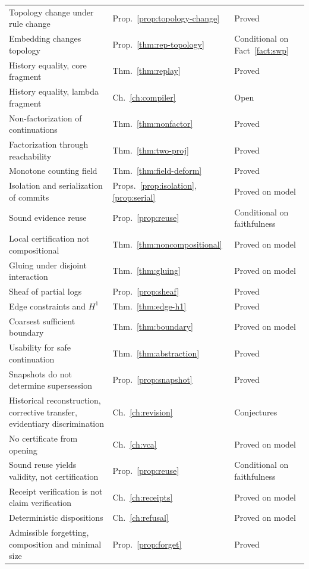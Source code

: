 \documentclass[12pt,oneside,openany]{book}
\theoremstyle{spherepop}
\theoremstyle{remarkstyle}
\begin{document}
\begin{center}
\begin{longtable}{p{}p{}p{}}
Topology change under rule change & Prop.~\ref{prop:topology-change} & Proved \\
Embedding changes topology & Prop.~\ref{thm:rep-topology} & Conditional on Fact~\ref{fact:swp} \\
History equality, core fragment & Thm.~\ref{thm:replay} & Proved \\
History equality, lambda fragment & Ch.~\ref{ch:compiler} & Open \\
Non-factorization of continuations & Thm.~\ref{thm:nonfactor} & Proved \\
Factorization through reachability & Thm.~\ref{thm:two-proj} & Proved \\
Monotone counting field & Thm.~\ref{thm:field-deform} & Proved \\
Isolation and serialization of commits & Props.~\ref{prop:isolation}, \ref{prop:serial} & Proved on model \\
Sound evidence reuse & Prop.~\ref{prop:reuse} & Conditional on faithfulness \\
Local certification not compositional & Thm.~\ref{thm:noncompositional} & Proved on model \\
Gluing under disjoint interaction & Thm.~\ref{thm:gluing} & Proved on model \\
Sheaf of partial logs & Prop.~\ref{prop:sheaf} & Proved \\
Edge constraints and $H^1$ & Thm.~\ref{thm:edge-h1} & Proved \\
Coarsest sufficient boundary & Thm.~\ref{thm:boundary} & Proved on model \\
Usability for safe continuation & Thm.~\ref{thm:abstraction} & Proved \\
Snapshots do not determine supersession & Prop.~\ref{prop:snapshot} & Proved \\
Historical reconstruction, corrective transfer, evidentiary discrimination & Ch.~\ref{ch:revision} & Conjectures \\
No certificate from opening & Ch.~\ref{ch:vca} & Proved on model \\
Sound reuse yields validity, not certification & Prop.~\ref{prop:reuse} & Conditional on faithfulness \\
Receipt verification is not claim verification & Ch.~\ref{ch:receipts} & Proved on model \\
Deterministic dispositions & Ch.~\ref{ch:refusal} & Proved on model \\
Admissible forgetting, composition and minimal size & Prop.~\ref{prop:forget} & Proved \\

\end{longtable}
\end{center}
\end{document}
